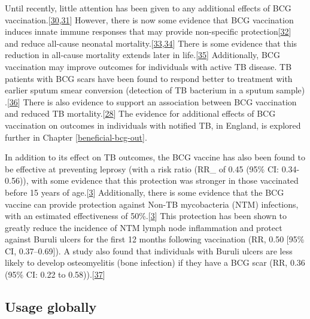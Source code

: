 \documentclass[11pt,twoside]{bristolthesis}
\begin{document}
  Until recently, little attention has been given to any additional effects of BCG vaccination.{[}\protect\hyperlink{ref-Fine2005a}{30},\protect\hyperlink{ref-Teo2006}{31}{]} However, there is now some evidence that BCG vaccination induces innate immune responses that may provide non-specific protection{[}\protect\hyperlink{ref-Kleinnijenhuis2012}{32}{]} and reduce all-cause neonatal mortality.{[}\protect\hyperlink{ref-Garly2003}{33},\protect\hyperlink{ref-Higgins}{34}{]} There is some evidence that this reduction in all-cause mortality extends later in life.{[}\protect\hyperlink{ref-Rieckmann2016}{35}{]} Additionally, BCG vaccination may improve outcomes for individuals with active TB disease. TB patients with BCG scars have been found to respond better to treatment with earlier sputum smear conversion (detection of TB bacterium in a sputum sample) .{[}\protect\hyperlink{ref-Jeremiah2010}{36}{]} There is also evidence to support an association between BCG vaccination and reduced TB mortality.{[}\protect\hyperlink{ref-Abubakar2013}{28}{]} The evidence for additional effects of BCG vaccination on outcomes in individuals with notified TB, in England, is explored further in Chapter \ref{beneficial-bcg-out}.
  
  In addition to its effect on TB outcomes, the BCG vaccine has also been found to be effective at preventing leprosy (with a risk ratio (RR\_ of 0.45 (95\% CI: 0.34-0.56)), with some evidence that this protection was stronger in those vaccinated before 15 years of age.{[}\protect\hyperlink{ref-TheWorldHealthOrganization:2018va}{3}{]} Additionally, there is some evidence that the BCG vaccine can provide protection against Non-TB mycobacteria (NTM) infections, with an estimated effectiveness of 50\%.{[}\protect\hyperlink{ref-TheWorldHealthOrganization:2018va}{3}{]} This protection has been shown to greatly reduce the incidence of NTM lymph node inflammation and protect against Buruli ulcers for the first 12 months following vaccination (RR, 0.50 {[}95\% CI, 0.37--0.69{]}). A study also found that individuals with Buruli ulcers are less likely to develop osteomyelitis (bone infection) if they have a BCG scar (RR, 0.36 (95\% CI: 0.22 to 0.58)).{[}\protect\hyperlink{ref-Zimmermann:2018io}{37}{]}
  
  \hypertarget{usage-globally}{%
  \subsection{Usage globally}\label{usage-globally}}
  
\end{document}
